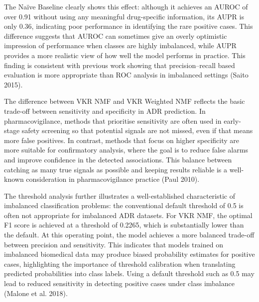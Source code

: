 \documentclass{article}
\begin{document}
The Naïve Baseline clearly shows this effect: although it achieves an
AUROC of over 0.91 without using any meaningful drug-specific
information, its AUPR is only 0.36, indicating poor performance in
identifying the rare positive cases. This difference suggests that AUROC
can sometimes give an overly optimistic impression of performance when
classes are highly imbalanced, while AUPR provides a more realistic view
of how well the model performs in practice. This finding is consistent
with previous work showing that precision--recall based evaluation is
more appropriate than ROC analysis in imbalanced settings (Saito 2015).

The difference between VKR NMF and VKR Weighted NMF reflects the basic
trade-off between sensitivity and specificity in ADR prediction. In
pharmacovigilance, methods that prioritise sensitivity are often used in
early-stage safety screening so that potential signals are not missed,
even if that means more false positives. In contrast, methods that focus
on higher specificity are more suitable for confirmatory analysis, where
the goal is to reduce false alarms and improve confidence in the
detected associations. This balance between catching as many true
signals as possible and keeping results reliable is a well-known
consideration in pharmacovigilance practice (Paul 2010).

The threshold analysis further illustrates a well-established
characteristic of imbalanced classification problems: the conventional
default threshold of 0.5 is often not appropriate for imbalanced ADR
datasets. For VKR NMF, the optimal F1 score is achieved at a threshold
of 0.2265, which is substantially lower than the default. At this
operating point, the model achieves a more balanced trade-off between
precision and sensitivity. This indicates that models trained on
imbalanced biomedical data may produce biased probability estimates for
positive cases, highlighting the importance of threshold calibration
when translating predicted probabilities into class labels. Using a
default threshold such as 0.5 may lead to reduced sensitivity in
detecting positive cases under class imbalance (Malone et al. 2018).
\end{document}
